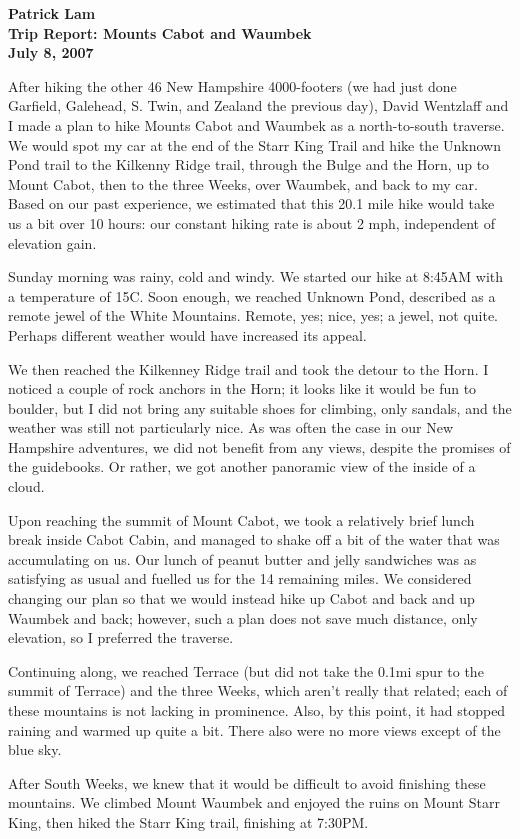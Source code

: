 \documentclass[11pt]{article}
\begin{document}
\thispagestyle{empty}

\begin{center}
\begin{large}
\textbf{Patrick Lam} \\
\textbf{Trip Report: Mounts Cabot and Waumbek} \\
\textbf{July 8, 2007}
\end{large}
\end{center}

After hiking the other 46 New Hampshire 4000-footers (we had just done
Garfield, Galehead, S. Twin, and Zealand the previous day), David
Wentzlaff and I made a plan to hike Mounts Cabot and Waumbek as a
north-to-south traverse. We would spot my car at the end of the Starr King
Trail and hike the Unknown Pond trail to the Kilkenny Ridge trail,
through the Bulge and the Horn, up to Mount Cabot, then to the three
Weeks, over Waumbek, and back to my car. Based on our past experience,
we estimated that this 20.1 mile hike would take us a bit over 10 hours:
our constant hiking rate is about 2 mph, independent of elevation gain.

Sunday morning was rainy, cold and windy. We started our hike at
8:45AM with a temperature of 15C. Soon enough, we reached Unknown
Pond, described as a remote jewel of the White Mountains. Remote, yes;
nice, yes; a jewel, not quite. Perhaps different weather would have
increased its appeal.

We then reached the Kilkenney Ridge trail and took the detour to the
Horn.  I noticed a couple of rock anchors in the Horn; it looks like
it would be fun to boulder, but I did not bring any suitable shoes for
climbing, only sandals, and the weather was still not particularly
nice. As was often the case in our New Hampshire adventures, we did
not benefit from any views, despite the promises of the guidebooks. Or
rather, we got another panoramic view of the inside of a cloud.

Upon reaching the summit of Mount Cabot, we took a relatively brief
lunch break inside Cabot Cabin, and managed to shake off a bit of the
water that was accumulating on us. Our lunch of peanut butter and
jelly sandwiches was as satisfying as usual and fuelled us for the 14
remaining miles. We considered changing our plan so that we would instead
hike up Cabot and back and up Waumbek and back; however, such a plan
does not save much distance, only elevation, so I preferred the traverse.

Continuing along, we reached Terrace (but did not take the 0.1mi spur
to the summit of Terrace) and the three Weeks, which aren't really
that related; each of these mountains is not lacking in prominence.
Also, by this point, it had stopped raining and warmed up quite a bit.
There also were no more views except of the blue sky.

After South Weeks, we knew that it would be difficult to avoid
finishing these mountains. We climbed Mount Waumbek and enjoyed
the ruins on Mount Starr King, then hiked the Starr King trail,
finishing at 7:30PM.
\end{document}

